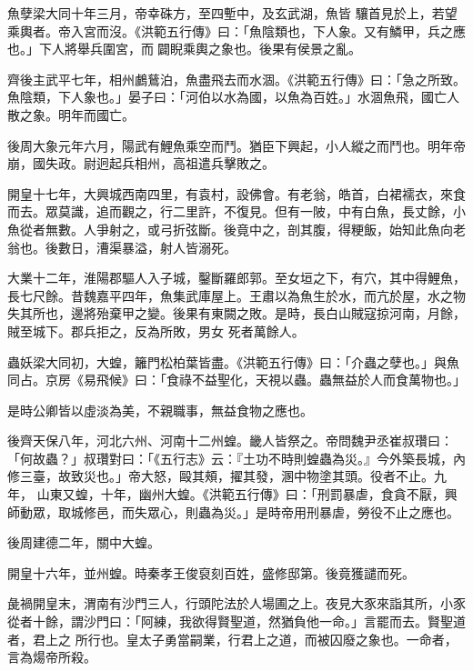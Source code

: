\begin{pinyinscope}
 魚孽梁大同十年三月，帝幸硃方，至四塹中，及玄武湖，魚皆
 驤首見於上，若望乘輿者。帝入宮而沒。《洪範五行傳》曰：「魚陰類也，下人象。又有鱗甲，兵之應也。」下人將舉兵圍宮，而闢睨乘輿之象也。後果有侯景之亂。



 齊後主武平七年，相州鸕鶿泊，魚盡飛去而水涸。《洪範五行傳》曰：「急之所致。魚陰類，下人象也。」晏子曰：「河伯以水為國，以魚為百姓。」水涸魚飛，國亡人散之象。明年而國亡。



 後周大象元年六月，陽武有鯉魚乘空而鬥。猶臣下興起，小人縱之而鬥也。明年帝崩，國失政。尉迥起兵相州，高祖遣兵擊敗之。



 開皇十七年，大興城西南四里，有袁村，設佛會。有老翁，皓首，白裙襦衣，來食而去。眾莫識，追而觀之，行二里許，不復見。但有一陂，中有白魚，長丈餘，小魚從者無數。人爭射之，或弓折弦斷。後竟中之，剖其腹，得粳飯，始知此魚向老翁也。後數日，漕渠暴溢，射人皆溺死。



 大業十二年，淮陽郡驅人入子城，鑿斷羅郎郭。至女垣之下，有穴，其中得鯉魚，長七尺餘。昔魏嘉平四年，魚集武庫屋上。王肅以為魚生於水，而亢於屋，水之物失其所也，邊將殆棄甲之變。後果有東闕之敗。是時，長白山賊寇掠河南，月餘，賊至城下。郡兵拒之，反為所敗，男女
 死者萬餘人。



 蟲妖梁大同初，大蝗，籬門松柏葉皆盡。《洪範五行傳》曰：「介蟲之孽也。」與魚同占。京房《易飛候》曰：「食祿不益聖化，天視以蟲。蟲無益於人而食萬物也。」



 是時公卿皆以虛淡為美，不親職事，無益食物之應也。



 後齊天保八年，河北六州、河南十二州蝗。畿人皆祭之。帝問魏尹丞崔叔瓚曰：「何故蟲？」叔瓚對曰：「《五行志》云：『土功不時則蝗蟲為災。』今外築長城，內修三臺，故致災也。」帝大怒，毆其頰，擢其發，溷中物塗其頭。役者不止。九年，
 山東又蝗，十年，幽州大蝗。《洪範五行傳》曰：「刑罰暴虐，食貪不厭，興師動眾，取城修邑，而失眾心，則蟲為災。」是時帝用刑暴虐，勞役不止之應也。



 後周建德二年，關中大蝗。



 開皇十六年，並州蝗。時秦孝王俊裒刻百姓，盛修邸第。後竟獲譴而死。



 彘禍開皇末，渭南有沙門三人，行頭陀法於人場圃之上。夜見大豕來詣其所，小豕從者十餘，謂沙門曰：「阿練，我欲得賢聖道，然猶負他一命。」言罷而去。賢聖道者，君上之
 所行也。皇太子勇當嗣業，行君上之道，而被囚廢之象也。一命者，言為煬帝所殺。




\end{pinyinscope}
